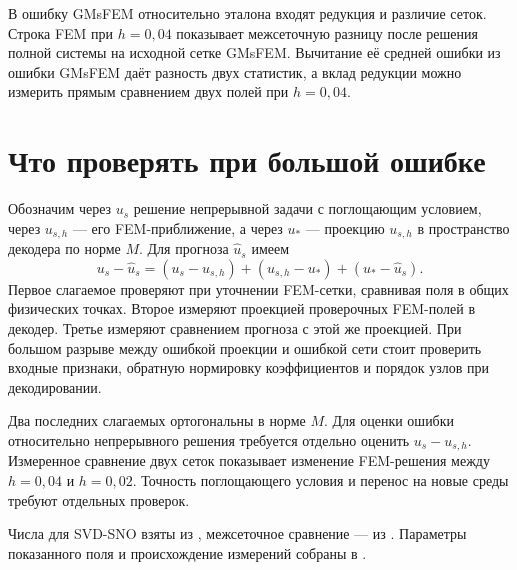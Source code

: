 В ошибку GMsFEM относительно эталона входят редукция и различие сеток.
Строка FEM при $h=0{,}04$ показывает межсеточную разницу после решения
полной системы на исходной сетке GMsFEM. Вычитание её
средней ошибки из ошибки GMsFEM даёт разность двух статистик,
а вклад редукции можно измерить прямым сравнением двух полей при
$h=0{,}04$.

\clearpage
\section{Что проверять при большой ошибке}

Обозначим через $u_s$ решение непрерывной задачи с поглощающим
условием, через $u_{s,h}$ --- его FEM-приближение, а через $u_*$ ---
проекцию $u_{s,h}$ в пространство декодера по норме $M$. Для
прогноза $\widehat u_s$ имеем
\[
 u_s-\widehat u_s
 =(u_s-u_{s,h})+(u_{s,h}-u_*)+(u_*-\widehat u_s).
\]
Первое слагаемое проверяют при уточнении FEM-сетки, сравнивая поля
в общих физических точках. Второе измеряют проекцией проверочных
FEM-полей в декодер. Третье измеряют сравнением прогноза с этой же
проекцией. При большом разрыве между ошибкой проекции и ошибкой
сети стоит проверить входные признаки, обратную нормировку
коэффициентов и порядок узлов при декодировании.

Два последних слагаемых ортогональны в норме $M$. Для оценки ошибки
относительно непрерывного решения требуется отдельно оценить
$u_s-u_{s,h}$. Измеренное сравнение двух сеток показывает изменение
FEM-решения между $h=0{,}04$ и $h=0{,}02$. Точность поглощающего
условия и перенос на новые среды требуют отдельных проверок.

Числа для SVD-SNO взяты из
,
межсеточное сравнение --- из
.
Параметры показанного поля и происхождение измерений собраны в
.
